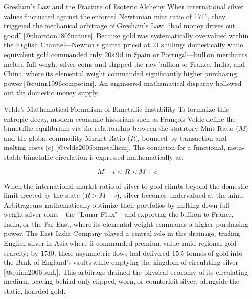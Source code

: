 \documentclass[
  ignorenonframetext,
]{beamer}
\author{\texorpdfstring{}{}}
\date{}
\begin{document}
\begin{frame}{Gresham's Law and the Fracture of Esoteric Alchemy}
\protect{}\label{greshams-law-and-the-fracture-of-esoteric-alchemy}
When international silver values fluctuated against the enforced
Newtonian mint ratio of 1717, they triggered the mechanical arbitrage of
Gresham's Law: ``bad money drives out good'' {[}@thornton1802nature{]}.
Because gold was systematically overvalued within the English
Channel---Newton's guinea priced at 21 shillings domestically while
equivalent gold commanded only 20s 9d in Spain or Portugal---bullion
merchants melted full-weight silver coins and shipped the raw bullion to
France, India, and China, where its elemental weight commanded
significantly higher purchasing power {[}@quinn1996competing{]}. An
engineered mathematical disparity hollowed out the domestic money
supply.

\begin{block}{Velde's Mathematical Formalism of Bimetallic Instability}
\protect{}\label{veldes-mathematical-formalism-of-bimetallic-instability}
To formalize this entropic decay, modern economic historians such as
François Velde define the bimetallic equilibrium via the relationship
between the statutory Mint Ratio (\(M\)) and the global commodity Market
Ratio (\(R\)), bounded by transaction and melting costs (\(c\))
{[}@velde2005bimetallism{]}. The condition for a functional, meta-stable
bimetallic circulation is expressed mathematically as:

\begin{equation}
\label{eq:bimetallic_bounds}
M - c < R < M + c
\end{equation}

When the international market ratio of silver to gold climbs beyond the
domestic limit erected by the state (\(R > M + c\)), silver becomes
undervalued at the mint. Arbitrageurs mathematically optimize their
portfolios by melting down full-weight silver coins---the ``Lunar
Flux''---and exporting the bullion to France, India, or the Far East,
where its elemental weight commands a higher purchasing power. The East
India Company played a central role in this drainage, trading English
silver in Asia where it commanded premium value amid regional gold
scarcity; by 1730, these asymmetric flows had delivered 15.5 tonnes of
gold into the Bank of England's vaults while emptying the kingdom of
circulating silver {[}@quinn2006bank{]}. This arbitrage drained the
physical economy of its circulating medium, leaving behind only clipped,
worn, or counterfeit silver, alongside the static, hoarded gold.
\end{block}


\end{frame}
\end{document}
